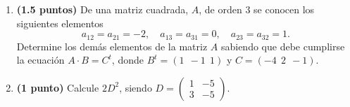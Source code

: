 
\begin{enumerate}[label=\alph*)]
\item \textbf{(1.5 puntos)} De una matriz cuadrada, $A$, de orden 3 se conocen los siguientes elementos
\[
a_{12}=a_{21}=-2,\quad a_{13}=a_{31}=0,\quad a_{23}=a_{32}=1.
\]
Determine los demás elementos de la matriz $A$ sabiendo que debe cumplirse la ecuación $A\cdot B=C^t$, donde $B^t=(1\ \ -1\ \ 1)$ y $C=(-4\ \ 2\ \ -1)$.
\item \textbf{(1 punto)} Calcule $2D^2$, siendo $D=\begin{pmatrix}1&-5\\3&-5\end{pmatrix}$.
\end{enumerate}
